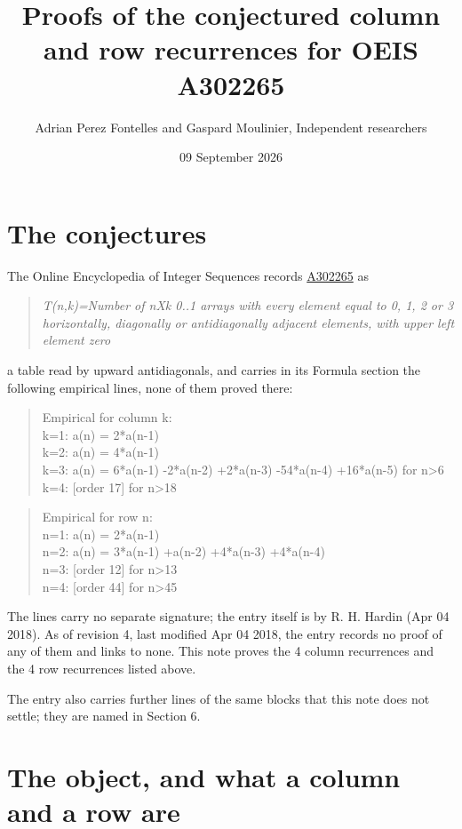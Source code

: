 \documentclass[11pt]{article}
\title{Proofs of the conjectured column and row recurrences for OEIS A302265}
\author{Adrian Perez Fontelles and Gaspard Moulinier, Independent researchers}
\date{09 September 2026}
\theoremstyle{definition}
\begin{document}
\maketitle
\section{The conjectures}

The Online Encyclopedia of Integer Sequences records \href{https://oeis.org/A302265}{A302265} as

\begin{quote}\itshape T(n,k)=Number of nXk 0..1 arrays with every element equal to 0, 1, 2 or 3 horizontally, diagonally or antidiagonally adjacent elements, with upper left element zero\end{quote}

a table read by upward antidiagonals, and carries in its Formula section the following empirical lines, none of them proved there:

\begin{quote}\ttfamily Empirical for column k:\\
k=1: a(n) = 2*a(n-1)\\k=2: a(n) = 4*a(n-1)\\k=3: a(n) = 6*a(n-1) -2*a(n-2) +2*a(n-3) -54*a(n-4) +16*a(n-5) for n>6\\k=4: [order 17] for n>18\end{quote}

\begin{quote}\ttfamily Empirical for row n:\\
n=1: a(n) = 2*a(n-1)\\n=2: a(n) = 3*a(n-1) +a(n-2) +4*a(n-3) +4*a(n-4)\\n=3: [order 12] for n>13\\n=4: [order 44] for n>45\end{quote}

The lines carry no separate signature; the entry itself is by R. H. Hardin (Apr 04 2018). As of revision 4, last modified Apr 04 2018, the entry records no proof of any of them and links to none. This note proves the 4 column recurrences and the 4 row recurrences listed above.

The entry also carries further lines of the same blocks that this note does not settle; they are named in Section 6.

\section{The object, and what a column and a row are}
\end{document}
